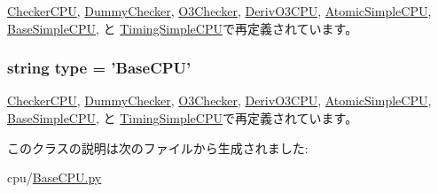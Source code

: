 \hyperlink{classCheckerCPU_1_1CheckerCPU_a17da7064bc5c518791f0c891eff05fda}{CheckerCPU}, \hyperlink{classDummyChecker_1_1DummyChecker_a17da7064bc5c518791f0c891eff05fda}{DummyChecker}, \hyperlink{classO3Checker_1_1O3Checker_a17da7064bc5c518791f0c891eff05fda}{O3Checker}, \hyperlink{classO3CPU_1_1DerivO3CPU_a17da7064bc5c518791f0c891eff05fda}{DerivO3CPU}, \hyperlink{classAtomicSimpleCPU_1_1AtomicSimpleCPU_a17da7064bc5c518791f0c891eff05fda}{AtomicSimpleCPU}, \hyperlink{classBaseSimpleCPU_1_1BaseSimpleCPU_a17da7064bc5c518791f0c891eff05fda}{BaseSimpleCPU}, と \hyperlink{classTimingSimpleCPU_1_1TimingSimpleCPU_a17da7064bc5c518791f0c891eff05fda}{TimingSimpleCPU}で再定義されています。\hypertarget{classBaseCPU_1_1BaseCPU_acce15679d830831b0bbe8ebc2a60b2ca}{
\subsubsection[{type}]{\setlength{\rightskip}{0pt plus 5cm}string {\bf type} = '{\bf BaseCPU}'}}
\label{classBaseCPU_1_1BaseCPU_acce15679d830831b0bbe8ebc2a60b2ca}


\hyperlink{classCheckerCPU_1_1CheckerCPU_acce15679d830831b0bbe8ebc2a60b2ca}{CheckerCPU}, \hyperlink{classDummyChecker_1_1DummyChecker_acce15679d830831b0bbe8ebc2a60b2ca}{DummyChecker}, \hyperlink{classO3Checker_1_1O3Checker_acce15679d830831b0bbe8ebc2a60b2ca}{O3Checker}, \hyperlink{classO3CPU_1_1DerivO3CPU_acce15679d830831b0bbe8ebc2a60b2ca}{DerivO3CPU}, \hyperlink{classAtomicSimpleCPU_1_1AtomicSimpleCPU_acce15679d830831b0bbe8ebc2a60b2ca}{AtomicSimpleCPU}, \hyperlink{classBaseSimpleCPU_1_1BaseSimpleCPU_acce15679d830831b0bbe8ebc2a60b2ca}{BaseSimpleCPU}, と \hyperlink{classTimingSimpleCPU_1_1TimingSimpleCPU_acce15679d830831b0bbe8ebc2a60b2ca}{TimingSimpleCPU}で再定義されています。

このクラスの説明は次のファイルから生成されました:\begin{DoxyCompactItemize}
\item 
cpu/\hyperlink{BaseCPU_8py}{BaseCPU.py}\end{DoxyCompactItemize}
